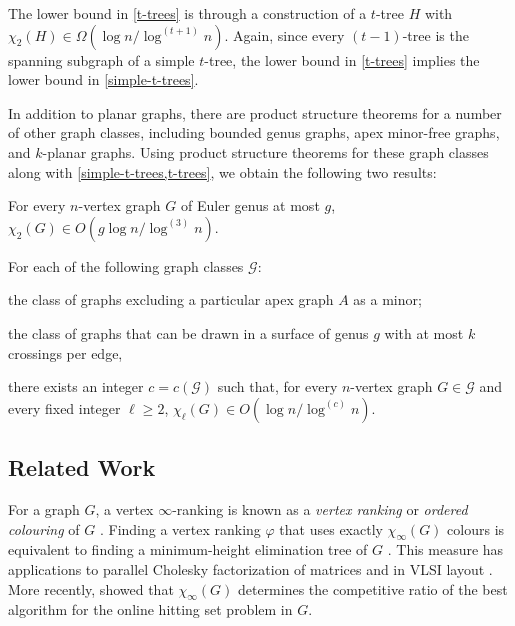\documentclass[kpfonts]{patmorin}
\newcommand{\trn}{\chi_2}
\newcommand{\lrn}{\chi_{\ell}}
\theoremstyle{named}
\begin{document}
The lower bound in \cref{t-trees} is through a construction of a $t$-tree $H$ with $\trn(H)\in\Omega(\log n/\log^{(t+1)} n)$.  Again, since every $(t-1)$-tree is the spanning subgraph of a simple $t$-tree, the lower bound in \cref{t-trees} implies the lower bound in \cref{simple-t-trees}.

In addition to planar graphs, there are product structure theorems for a number of other graph classes, including bounded genus graphs, apex minor-free graphs, and $k$-planar graphs.  Using product structure theorems for these graph classes along with \cref{simple-t-trees,t-trees}, we obtain the following two results:

\begin{thm}\label{bounded-genus}
    For every $n$-vertex graph $G$ of Euler genus at most $g$, $\trn(G)\in O(g\log n/\log^{(3)} n)$.
\end{thm}

\begin{thm}\label{meta-theorem}\label{meta}
    For each of the following graph classes $\mathcal{G}$:
    \begin{compactenum}
        \item the class of graphs excluding a particular apex graph $A$ as a minor;
        \item the class of graphs that can be drawn in a surface of genus $g$ with at most $k$ crossings per edge,
    \end{compactenum}
    there exists an integer $c=c(\mathcal{G})$ such that, for every $n$-vertex graph $G\in\mathcal{G}$ and every fixed integer $\ell\ge 2$, $\lrn(G)\in O(\log n/\log^{(c)} n)$.
\end{thm}



\subsection{Related Work}

For a graph $G$, a vertex $\infty$-ranking is known as a \emph{vertex ranking} \cite{bodlaender.deogun.ea:rankings} or \emph{ordered colouring} of $G$ \cite{katchalski.mccuaig.ea:ordered}.  Finding a vertex ranking $\varphi$ that uses exactly $\chi_\infty(G)$ colours is equivalent to finding a minimum-height elimination tree of $G$ \cite{torre.greenlaw.ea:optimal,deogun.kloks.ea:on}.  This measure has applications to parallel Cholesky factorization of matrices \cite{bodlaender.gilbert.ea:approximating,duff.reid:multifrontal,liu:role,dereniowski.kubale:cholesky} and in VLSI layout \cite{leiserson:area,sen.deng.ea:on}.  More recently, \citet{even.smorodinsky:hitting} showed that $\chi_\infty(G)$ determines the competitive ratio of the best algorithm for the online hitting set problem in $G$.
\end{document}
